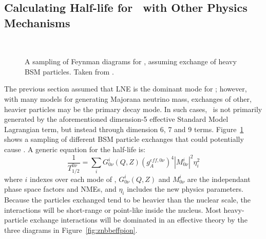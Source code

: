 \documentclass[/main.tex]{subfiles}
\begin{document}
\subsection{Calculating Half-life for \znbb\ with Other Physics Mechanisms}
\begin{figure}[t]
  \centering
  \\
  \caption[\znbb\ Diagrams from Heavy BSM Mechanisms]{\label{fig:znbbheavy}
    A sampling of Feynman diagrams for \znbb, assuming exchange of heavy BSM particles. Taken from \cite{Rodejohann2015}.
  }
\end{figure}
The previous section assumed that LNE is the dominant mode for \znbb; however, with many models for generating Majorana neutrino mass, exchanges of other, heavier particles may be the primary decay mode.
In such cases, \znbb\ is not primarily generated by the aforementioned dimension-5 effective Standard Model Lagrangian term, but instead through dimension 6, 7 and 9 terms\cite{Cirigliano2018_2}.
Figure~\ref{fig:znbbheavy} shows a sampling of different BSM particle exchanges that could potentially cause \znbb.
A generic equation for the half-life is:
\begin{equation}
  \frac{1}{T^{0\nu}_{1/2}}=\sum_iG^i_{0\nu}(Q,Z)(g_A^{eff,0\nu})^4|M^i_{0\nu}|^2\eta_i^2
\end{equation}
where $i$ indexes over each mode of \znbb, $G^i_{0\nu}(Q,Z)$ and $M^i_{0\nu}$ are the independant phase space factors and NMEs, and $\eta_i$ includes the new physics parameters.
Because the particles exchanged tend to be heavier than the nuclear scale, the interactions will be short-range or point-like inside the nucleus.
Most heavy-particle exchange interactions will be dominated in an effective theory by the three diagrams in Figure~\ref{fig:znbbeffpion}.
\end{document}
